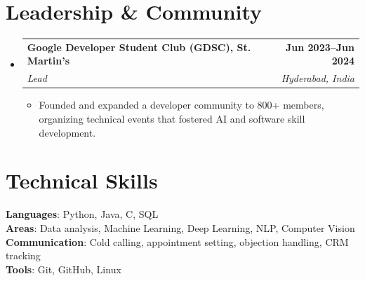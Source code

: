 \documentclass[letterpaper,11pt]{article}
\makeatletter
\newcommand{\resumeItem}[1]{\item\small{{#1 \vspace{-2pt}}}}
\newcommand{\resumeSubheading}[4]{%
  \vspace{-2pt}\item
  \begin{tabular*}{1.0\textwidth}[t]{l@{\extracolsep{\fill}}r}
    \textbf{#1} & \textbf{\small #2} \\
    \textit{\small #3} & \textit{\small #4} \\
  \end{tabular*}\vspace{-7pt}
}
\newcommand{\resumeSubHeadingListStart}{\begin{itemize}[leftmargin=0.0in,label={}]}
\newcommand{\resumeSubHeadingListEnd}{\end{itemize}}
\newcommand{\resumeItemListStart}{\begin{itemize}}
\newcommand{\resumeItemListEnd}{\end{itemize}\vspace{-5pt}}
\makeatother
\begin{document}
\section{Leadership \& Community}
\resumeSubHeadingListStart
\resumeSubheading{Google Developer Student Club (GDSC), St. Martin's}{Jun 2023–Jun 2024}{Lead}{Hyderabad, India}
\resumeItemListStart
  \resumeItem{Founded and expanded a developer community to 800+ members, organizing technical events that fostered AI and software skill development.}
\resumeItemListEnd
\resumeSubHeadingListEnd
\section{Technical Skills}
\begin{itemize}[leftmargin=0.15in,label={}]
  \small{\item{
    \textbf{Languages}{: Python, Java, C, SQL} \\
    \textbf{Areas}{: Data analysis, Machine Learning, Deep Learning, NLP, Computer Vision} \\
    \textbf{Communication}{: Cold calling, appointment setting, objection handling, CRM tracking} \\
    \textbf{Tools}{: Git, GitHub, Linux} \\
  }}
\end{itemize}
\vspace{-16pt}
\end{document}
